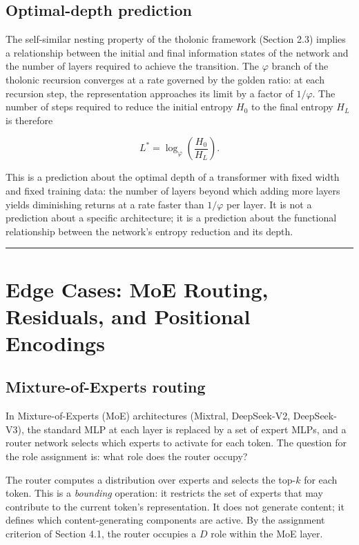 \documentclass[12pt]{article}
\begin{document}
\subsection{Optimal-depth prediction}\label{optimal-depth-prediction}

The self-similar nesting property of the tholonic framework (Section
2.3) implies a relationship between the initial and final information
states of the network and the number of layers required to achieve the
transition. The \(\varphi\) branch of the tholonic recursion converges
at a rate governed by the golden ratio: at each recursion step, the
representation approaches its limit by a factor of \(1/\varphi\). The
number of steps required to reduce the initial entropy \(H_0\) to the
final entropy \(H_L\) is therefore

\[L^* = \log_\varphi\!\left(\frac{H_0}{H_L}\right).\]

This is a prediction about the optimal depth of a transformer with fixed
width and fixed training data: the number of layers beyond which adding
more layers yields diminishing returns at a rate faster than
\(1/\varphi\) per layer. It is not a prediction about a specific
architecture; it is a prediction about the functional relationship
between the network's entropy reduction and its depth.

\begin{center}\rule{0.5\linewidth}{0.5pt}\end{center}

\section{Edge Cases: MoE Routing, Residuals, and Positional Encodings}\label{edge-cases-moe-routing-residuals-and-positional-encodings}

\subsection{Mixture-of-Experts routing}\label{mixture-of-experts-routing}

In Mixture-of-Experts (MoE) architectures (Mixtral, DeepSeek-V2,
DeepSeek-V3), the standard MLP at each layer is replaced by a set of
expert MLPs, and a router network selects which experts to activate for
each token. The question for the role assignment is: what role does the
router occupy?

The router computes a distribution over experts and selects the
top-\(k\) for each token. This is a \emph{bounding} operation: it
restricts the set of experts that may contribute to the current token's
representation. It does not generate content; it defines which
content-generating components are active. By the assignment criterion of
Section 4.1, the router occupies a \(D\) role within the MoE layer.
\end{document}
